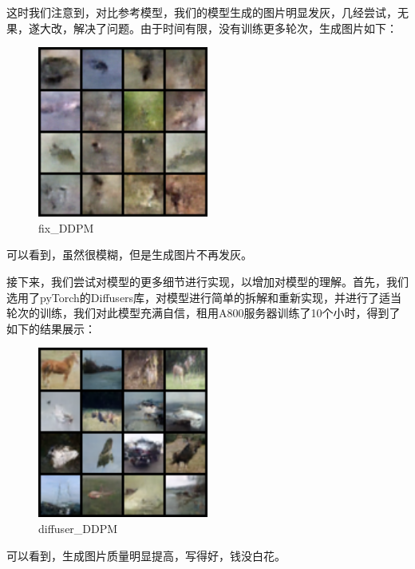 \documentclass{ctexart}
\begin{document}
\noindent
这时我们注意到，对比参考模型，我们的模型生成的图片明显发灰，几经尝试，无果，遂大改，解决了问题。由于时间有限，没有训练更多轮次，生成图片如下：
\begin{figure}[H]
     \centering
     \includegraphics[width=0.5\textwidth]{sample_fix.png}
     \caption{fix\_DDPM}
     \label{fig:fix_ddpm}  %
\end{figure}

\noindent
可以看到，虽然很模糊，但是生成图片不再发灰。

\noindent
接下来，我们尝试对模型的更多细节进行实现，以增加对模型的理解。首先，我们选用了pyTorch的Diffusers库，对模型进行简单的拆解和重新实现，并进行了适当轮次的训练，我们对此模型充满自信，租用A800服务器训练了10个小时，得到了如下的结果展示：
\begin{figure}[H]
     \centering
     \includegraphics[width=0.5\textwidth]{sample_diffuser.png}
     \caption{diffuser\_DDPM}
     \label{fig:diffuser_ddpm}  %
\end{figure}

\noindent
可以看到，生成图片质量明显提高，写得好，钱没白花。
\end{document}
